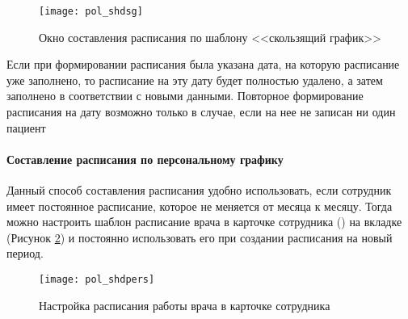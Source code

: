 \begin{figure}[ht]\centering
 \texttt{[image: pol\_shdsg]}
 \caption{Окно составления расписания по шаблону <<скользящий график>>}
 \label{img_pol_shdsg}
\end{figure} 

\begin{prim}
Если при формировании расписания была указана дата, на которую расписание уже заполнено, то расписание на эту дату будет полностью удалено, а затем заполнено в соответствии с новыми данными. Повторное формирование расписания на дату возможно только в случае, если на нее не записан ни один пациент 
\end{prim}

\paragraph{Составление расписания по персональному графику} \label{pol_shdpers}

Данный способ составления расписания удобно использовать, если сотрудник имеет постоянное расписание, которое не меняется от месяца к месяцу. Тогда можно настроить шаблон расписание врача в карточке сотрудника () на вкладке  (Рисунок \ref{img_pol_shdpers}) и постоянно использовать его при создании расписания на новый период.

\begin{figure}[ht]\centering
 \texttt{[image: pol\_shdpers]}
 \caption{Настройка расписания работы врача в карточке сотрудника}
 \label{img_pol_shdpers}
\end{figure} 

